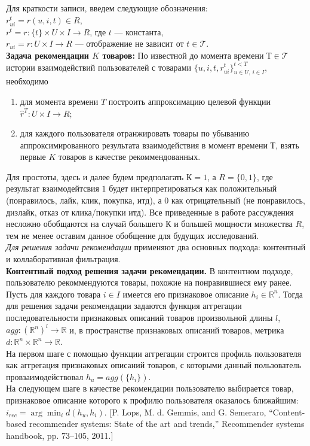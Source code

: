 \documentclass{mipt-thesis-ms}
\begin{document}
Для краткости записи, введем следующие обозначения: \\
$r^t_{ui} = r(u, i, t) \in R$, \\
$r^t = r:\{t\} \times U \times I \rightarrow R$, где $t$ --- константа, \\
$r_{ui} = r: U \times I \rightarrow R$ --- отображение не зависит от $t \in \mathcal{T}$.\\

{\bf Задача рекомендации $K$ товаров:} По известной до момента времени $Т \in \mathcal{T}$ истории взаимодействий пользователей с товарами $\{u, i, t, r_{ui}^t\}^{t<T}_{u \in U,\:i \in I}$, необходимо 
\begin{enumerate}
    \item для момента времени $T$ построить аппроксимацию целевой функции $\hat r^T: U \times I \rightarrow R$;
    \item для каждого пользователя отранжировать товары по убыванию аппроксимированного результата взаимодействия в момент времени $Т$, взять первые $K$ товаров в качестве рекоммендованных.
\end{enumerate}

Для простоты, здесь и далее будем предполагать $К = 1$, а $R = \{0, 1\}$, где результат взаимодейтсвия $1$ будет интерпретироваться как положительный (понравилось, лайк, клик, покупка, итд), а $0$ как отрицательный (не понравилось, дизлайк, отказ от клика/покупки итд). Все приведенные в работе рассуждения несложно обобщаются на случай большего $К$ и большей мощности множества $R$, тем не менее оставим данное обобщение для будущих исследований.\\

{\it Для решения задачи рекомендации} применяют два основных подхода: контентный и коллаборативная фильтрация.
\\

{\bf Контентный подход решения задачи рекомендации.} В контентном подходе, пользователю рекоммендуются товары, похожие на понравившиеся ему ранее.\\

Пусть для каждого товара $i \in I$ имеется его признаковое описание $h_i \in \mathbb{R}^n$. Тогда для решения задачи рекомендации задаются функция аггрегации последовательности признаковых описаний товаров произвольной длины $l$, $agg: (\mathbb{R}^n)^l \rightarrow \mathbb{R}$ и, в пространстве признаковых описаний товаров, метрика $d: \mathbb{R}^n \times \mathbb{R}^n \rightarrow \mathbb{R}$. \\
На первом шаге с помощью функции аггрегации строится профиль пользователя как аггрегация признаковых описаний товаров, с которыми данный пользователь провзаимодействовал $h_u = agg(\{h_i\})$. \\
На следующем шаге в качестве рекомендации пользователю выбирается товар, признаковое описание которого к профилю пользователя оказалось ближайшим: $i_{rec} = \arg \min_i d(h_u, h_i)$. [P. Lops, M. d. Gemmis, and G. Semeraro, “Content-based recommender systems: State of the art and trends,”
Recommender systems handbook, pp. 73–105, 2011.]\\
\end{document}
